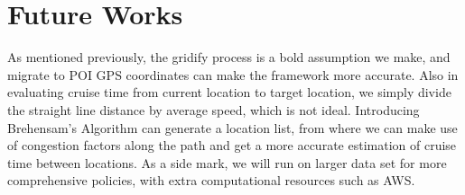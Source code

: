 \documentclass[letterpaper, 10 pt, conference]{ieeeconf}
\begin{document}
\section{Future Works}
As mentioned previously, the gridify process is a bold assumption we make, and migrate to POI GPS coordinates can make the framework more accurate. Also in evaluating cruise time from current location to target location, we simply divide the straight line distance by average speed, which is not ideal. Introducing Brehensam's Algorithm can generate a location list, from where we can make use of congestion factors along the path and get a more accurate estimation of cruise time between locations. As a side mark, we will run on larger data set for more comprehensive policies, with extra computational resources such as AWS.


\end{document}

